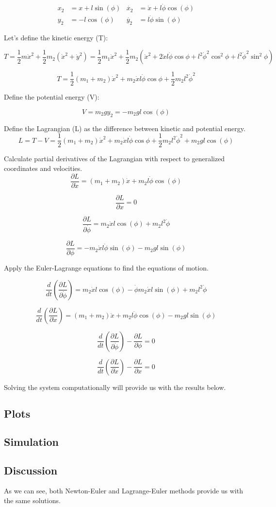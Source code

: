 \documentclass{article}
\begin{document}
\begin{align*}
  x_2 &= x + l \sin(\phi) & \dot{x_2} &= \dot{x} + l \dot{\phi} \cos(\phi) \\
  y_2 &= -l \cos(\phi) & \dot{y_2} &= l \dot{\phi} \sin(\phi)
\end{align*}

Let's define the kinetic energy (T):

\[T = \frac{1}{2} m \dot{x}^2 + \frac{1}{2} m_2 (\dot{x}^2 + \dot{y}^2) = \frac{1}{2} m_1 \dot{x}^2 + \frac{1}{2} m_2 (\dot{x}^2 + 2 \dot{x} l \dot{\phi} \cos{\phi} + l^2 \dot{\phi}^2 \cos^2{\phi} + l^2 \dot{\phi}^2 \sin^2{\phi})\]

\[T = \frac{1}{2} (m_1+m_2) \dot{x}^2  + m_2 \dot{x} l \dot{\phi} \cos{\phi} + \frac{1}{2} m_2 l^2 \dot{\phi}^2\]

Define the potential energy (V):

\[V = m_2 g y_2 = -m_2 g l \cos(\phi)\]

Define the Lagrangian (L) as the difference between kinetic and potential energy.
\[L = T - V = \frac{1}{2} (m_1+m_2) \dot{x}^2  + m_2 \dot{x} l \dot{\phi} \cos{\phi} + \frac{1}{2} m_2 l^2 \dot{\phi}^2 + m_2 g l \cos(\phi)\]

Calculate partial derivatives of the Lagrangian with respect to generalized coordinates and velocities.
\[ \frac{\partial L}{\partial \dot{x}} = (m_1+m_2) \dot{x} + m_2 l \dot{\phi} \cos(\phi)\]

\[ \frac{\partial L}{\partial x} = 0\]

\[ \frac{\partial L}{\partial \dot{\phi}} = m_2 \dot x l \cos(\phi) + m_2 l^2 \dot \phi\]

\[ \frac{\partial L}{\partial \phi} = -m_2 \dot x l \dot \phi \sin(\phi) - m_2 g l \sin(\phi)\]

Apply the Euler-Lagrange equations to find the equations of motion.

\[\frac{d}{dt} \left( \frac{\partial L}{\partial \dot{\phi}} \right) = m_2 \dot{x} l \cos(\phi) - \dot{\phi} m_2 \dot{x} l \sin(\phi) + m_2 l^2 \dot{\phi}
\] 

\[\frac{d}{dt} \left( \frac{\partial L}{\partial \dot{x}} \right) = (m_1+m_2) \ddot x + m_2 l \ddot \phi \cos(\phi) - m_2 g l \sin(\phi)\]

\[\frac{d}{dt} \left( \frac{\partial L}{\partial \dot{\phi}} \right) - \frac{\partial L}{\partial \phi} = 0\]

\[\frac{d}{dt} \left( \frac{\partial L}{\partial \dot{x}} \right) - \frac{\partial L}{\partial x} = 0\]

Solving the system computationally will provide us with the results below.


\subsection{Plots}
\subsection{Simulation}
\subsection{Discussion}
As we can see, both Newton-Euler and Lagrange-Euler methods provide us with the same solutions.
\end{document}
